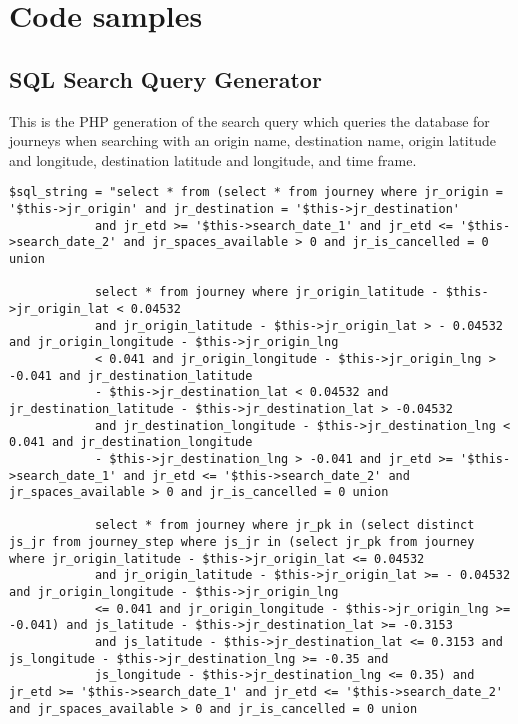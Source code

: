 \chapter{Code samples}

\section{SQL Search Query Generator}

This is the PHP generation of the search query which queries the database for journeys when searching with an origin name, destination name, origin latitude and longitude, destination latitude and longitude, and time frame.

\begin{verbatim}
$sql_string = "select * from (select * from journey where jr_origin = '$this->jr_origin' and jr_destination = '$this->jr_destination' 
            and jr_etd >= '$this->search_date_1' and jr_etd <= '$this->search_date_2' and jr_spaces_available > 0 and jr_is_cancelled = 0 union
                
            select * from journey where jr_origin_latitude - $this->jr_origin_lat < 0.04532
            and jr_origin_latitude - $this->jr_origin_lat > - 0.04532 and jr_origin_longitude - $this->jr_origin_lng
            < 0.041 and jr_origin_longitude - $this->jr_origin_lng > -0.041 and jr_destination_latitude
            - $this->jr_destination_lat < 0.04532 and jr_destination_latitude - $this->jr_destination_lat > -0.04532
            and jr_destination_longitude - $this->jr_destination_lng < 0.041 and jr_destination_longitude
            - $this->jr_destination_lng > -0.041 and jr_etd >= '$this->search_date_1' and jr_etd <= '$this->search_date_2' and jr_spaces_available > 0 and jr_is_cancelled = 0 union
                
            select * from journey where jr_pk in (select distinct js_jr from journey_step where js_jr in (select jr_pk from journey where jr_origin_latitude - $this->jr_origin_lat <= 0.04532
            and jr_origin_latitude - $this->jr_origin_lat >= - 0.04532 and jr_origin_longitude - $this->jr_origin_lng
            <= 0.041 and jr_origin_longitude - $this->jr_origin_lng >= -0.041) and js_latitude - $this->jr_destination_lat >= -0.3153
            and js_latitude - $this->jr_destination_lat <= 0.3153 and js_longitude - $this->jr_destination_lng >= -0.35 and
            js_longitude - $this->jr_destination_lng <= 0.35) and jr_etd >= '$this->search_date_1' and jr_etd <= '$this->search_date_2' and jr_spaces_available > 0 and jr_is_cancelled = 0 union
                

\end{verbatim}

